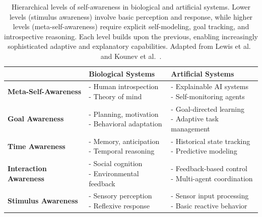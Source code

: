 \begin{table}[htbp]
  \centering
  \begin{footnotesize}
  \caption{Hierarchical levels of self-awareness in biological and artificial systems. Lower levels (stimulus awareness) involve basic perception and response, while higher levels (meta-self-awareness) require explicit self-modeling, goal tracking, and introspective reasoning. Each level builds upon the previous, enabling increasingly sophisticated adaptive and explanatory capabilities. Adapted from Lewis et al.~\citeyear{lewis2016self} and Kounev et al.~\citeyear{kounev2017notion}.}
  \label{tab:self_awareness_levels}
  \renewcommand\tabularxcolumn[1]{m{#1}}%
  \begin{tabularx}{\textwidth}{@{}>{\bfseries}m{4.2cm} X X@{}}
    \toprule
    & \textbf{Biological Systems} & \textbf{Artificial Systems} \\
    \midrule
    Meta-Self-Awareness &
      \makecell[l]{- Human introspection\\- Theory of mind} &
      \makecell[l]{- Explainable AI systems\\- Self-monitoring agents} \\
    \midrule
    Goal Awareness &
      \makecell[l]{- Planning, motivation\\- Behavioral adaptation} &
      \makecell[l]{- Goal-directed learning\\- Adaptive task management} \\
    \midrule
    Time Awareness &
      \makecell[l]{- Memory, anticipation\\- Temporal reasoning} &
      \makecell[l]{- Historical state tracking\\- Predictive modeling} \\
    \midrule
    Interaction Awareness &
      \makecell[l]{- Social cognition\\- Environmental feedback} &
      \makecell[l]{- Feedback-based control\\- Multi-agent coordination} \\
    \midrule
    Stimulus Awareness &
      \makecell[l]{- Sensory perception\\- Reflexive response} &
      \makecell[l]{- Sensor input processing\\- Basic reactive behavior} \\
    \bottomrule
  \end{tabularx}
  \end{footnotesize}
\end{table}


